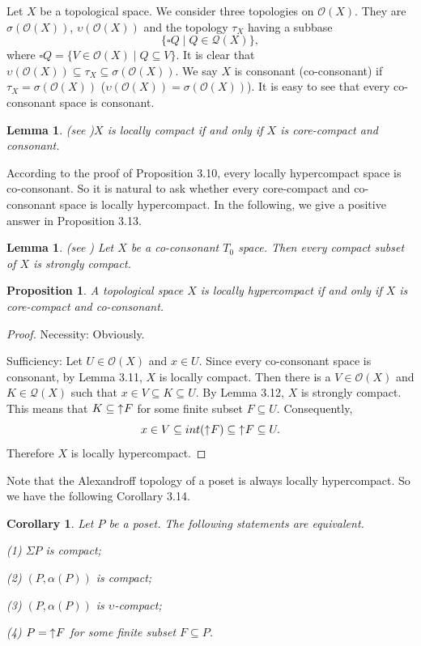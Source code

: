 \documentclass[preprint,12pt]{elsarticle}
\numberwithin{equation}{section}
\newtheorem{lemma}[theorem]{Lemma}
\newtheorem{proposition}[theorem]{Proposition}
\newtheorem{corollary}[theorem]{Corollary}
\newcommand{\up}{\mathord{\uparrow}\hspace{0.05em}}
\begin{document}
Let $X$ be a topological space. We consider three topologies on $\mathcal{O}(X)$. They are $\sigma (\mathcal{O}(X))$, $\upsilon(\mathcal{O}(X))$ and the topology $\tau_{X}$ having a subbase $$\{\square Q\mid Q\in\mathcal{Q}(X)\},$$ where $\square Q=\{V\in\mathcal{O}(X)\mid Q\subseteq V\}$. It is clear that $\upsilon(\mathcal{O}(X))\subseteq\tau_{X}\subseteq\sigma (\mathcal{O}(X))$. We say $X$ is consonant (co-consonant) if $\tau_{X}=\sigma (\mathcal{O}(X))$ ($\upsilon(\mathcal{O}(X))=\sigma (\mathcal{O}(X))$). It is easy to see that every co-consonant space is consonant.

\begin{lemma}(see \cite{GHY30})$X$ is locally compact if and only if $X$ is core-compact and consonant.

\end{lemma}


According to the proof of Proposition 3.10, every locally hypercompact space is co-consonant. So it is natural to ask whether every core-compact and co-consonant space is locally hypercompact. In the following, we give a positive answer in Proposition 3.13.

\begin{lemma} (see \cite{WM34}) Let $X$ be a co-consonant $T_{0}$ space. Then every compact subset of $X$ is strongly compact.

\end{lemma}


\begin{proposition} A topological space $X$ is locally hypercompact if and only if $X$ is core-compact and co-consonant.
\end{proposition}
\begin{proof}Necessity: Obviously.

Sufficiency: Let $U\in\mathcal{O}(X)$ and $x\in U$. Since every co-consonant space is consonant, by Lemma 3.11, $X$ is locally compact. Then there is a $V\in\mathcal{O}(X)$ and $K\in\mathcal{Q}(X)$ such that $x\in V\subseteq K\subseteq U$. By Lemma 3.12, $X$ is strongly compact. This means that $K\subseteq \up F$ for some finite subset $F\subseteq U$. Consequently, $$x\in V\subseteq int(\up F)\subseteq \up F\subseteq U.$$ Therefore $X$ is locally hypercompact.\end{proof}

\quad Note that the Alexandroff topology of a poset is always locally hypercompact. So we have the following Corollary 3.14.

\begin{corollary} Let $P$ be a poset. The following statements are equivalent.

{\rm (1)} $\Sigma P$ is compact;

{\rm (2)} $(P,\alpha(P))$ is compact;

{\rm (3)} $(P,\alpha(P))$ is $\upsilon$-compact;

{\rm (4)} $P=\up F$ for some finite subset $F\subseteq P$.



\end{corollary}
\end{document}
